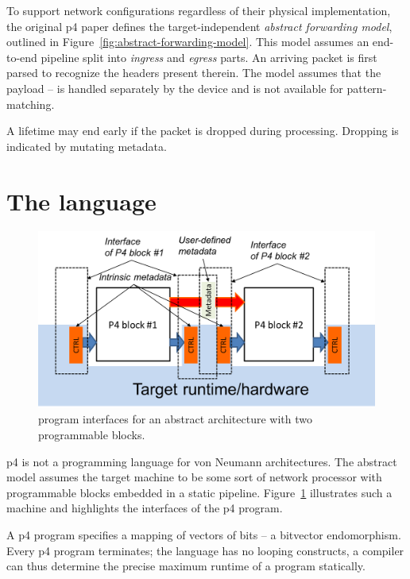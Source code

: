 To support network configurations regardless of their physical implementation,
the original \acrshort{p4} paper defines the target-independent \emph{abstract
forwarding model}, outlined in Figure~\ref{fig:abstract-forwarding-model}. This
model assumes an end-to-end pipeline split into \emph{ingress} and \emph{egress}
parts. An arriving packet is first parsed to recognize the headers present
therein. The model assumes that the payload --  is handled separately by the device
and is not available for pattern-matching.


A lifetime may end early if the packet is dropped during processing. Dropping is
indicated by mutating metadata.

\section{The \pfs language}

\begin{figure}[t]
	\includegraphics[width=1.00\textwidth]{resources/p4_16-architecture-model.png}

	\caption{\pfs program interfaces for an abstract architecture with two
	programmable blocks\cite{p416:v123:spec}.}
	\label{fig:arch-model}
\end{figure}

\acrshort{p4} is not a programming language for von Neumann architectures. The
abstract model assumes the target machine to be some sort of network processor
with programmable blocks embedded in a static pipeline.
Figure~\ref{fig:arch-model} illustrates such a machine and highlights the
interfaces of the \acrshort{p4} program.

A \acrshort{p4} program specifies a mapping of vectors of bits -- a bit\-vector
endomorphism. Every \acrshort{p4} program terminates; the language has no
looping constructs, a compiler can thus determine the precise maximum runtime of
a program statically.

